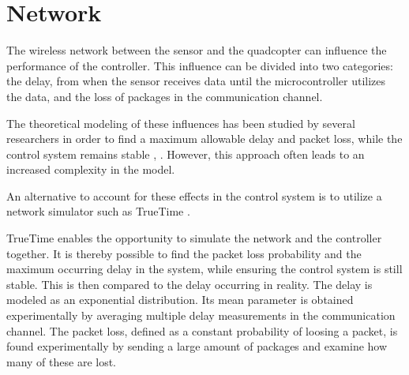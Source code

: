 \section{Network}
The wireless network between the sensor and the quadcopter can influence the performance of the controller. This influence can be divided into two categories: the delay, from when the sensor receives data until the microcontroller utilizes the data, and the loss of packages in the communication channel.


The theoretical modeling of these influences has been studied by several researchers in order to find a maximum allowable delay and packet loss, while the control system remains stable \cite{wang}, \cite{walsh}. However, this approach often leads to an increased complexity in the model. 

An alternative to account for these effects in the control system is to utilize a network simulator such as TrueTime \cite{TrueTimeNew}.

TrueTime enables the opportunity to simulate the network and the controller together. It is thereby possible to find the packet loss probability and the maximum occurring delay in the system, while ensuring the control system is still stable. This is then compared to the delay occurring in reality. The delay is modeled as an exponential distribution. Its mean parameter is obtained experimentally by averaging multiple delay measurements in the communication channel. The packet loss, defined as a constant probability of loosing a packet, is found experimentally by sending a large amount of packages and examine how many of these are lost.  

